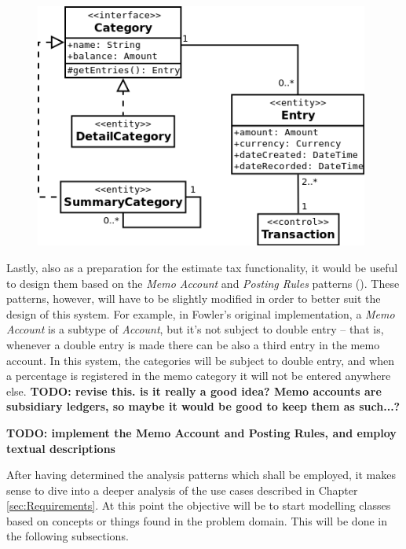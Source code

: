 \begin{figure}[ht!]
  \begin{center}
    \includegraphics[width=11cm]{./contents/img/Class_Diagram_-_Summary_Category.png}
  \end{center}
  \caption{}
  \label{fig:ClassDiagram.SummaryCategory}
\end{figure}
\FloatBarrier


Lastly, also as a preparation for the estimate tax functionality, it would be
useful to design them based on the \emph{Memo Account} and \emph{Posting Rules}
patterns (\cite[][Section~6.4~\&~6.5]{fowler1997analysis}). These patterns,
however, will have to be slightly modified in order to better suit the design
of this system. For example, in Fowler's original implementation, a \emph{Memo
Account} is a subtype of \emph{Account}, but it's not subject to double entry
-- that is, whenever a double entry is made there can be also a third entry in
the memo account. In this system, the categories will be subject to double
entry, and when a percentage is registered in the memo category it will not be
entered anywhere else. \textbf{TODO: revise this. is it really a good idea?
Memo accounts are subsidiary ledgers, so maybe it would be good to keep them as
such...?}

\textbf{TODO: implement the Memo Account and Posting Rules, and employ textual descriptions}


After having determined the analysis patterns which shall be employed, it makes
sense to dive into a deeper analysis of the use cases described in Chapter
\ref{sec:Requirements}. At this point the objective will be to start modelling
classes based on concepts or things found in the problem domain. This will be
done in the following subsections.

